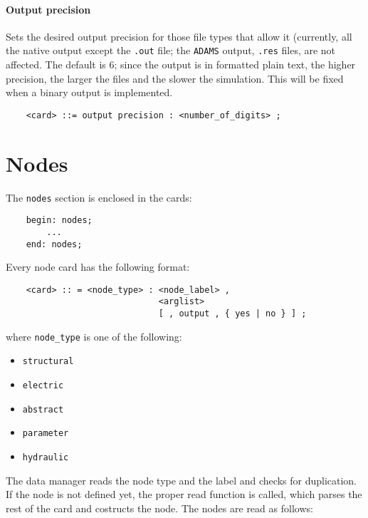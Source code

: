 \subsubsection{Output precision}
Sets the desired output precision for those file types that allow it
(currently, all the native output except the \texttt{.out} file; the
\texttt{ADAMS} output, \texttt{.res} files, are not affected.
The default is 6; since the output is in formatted plain text, the higher
precision, the larger the files and the slower the simulation.
This will be fixed when a binary output is implemented.
\begin{verbatim}
    <card> ::= output precision : <number_of_digits> ;
\end{verbatim}





\chapter{Nodes}
The \texttt{nodes} section is enclosed in the cards:
\begin{verbatim}
    begin: nodes;
        ...
    end: nodes;
\end{verbatim}
Every node card has the following format:
\begin{verbatim}
    <card> :: = <node_type> : <node_label> ,
                              <arglist>
                              [ , output , { yes | no } ] ;
\end{verbatim}
where \texttt{node\_type} is one of the following:
\begin{itemize}
    \item \texttt{structural}
    \item \texttt{electric}
    \item \texttt{abstract}
    \item \texttt{parameter}
    \item \texttt{hydraulic}
\end{itemize}
The data manager reads the node type and the label and checks for
duplication. If the node is not defined yet, the proper read function is
called, which parses the rest of the card and costructs the node.
The nodes are read as follows:





